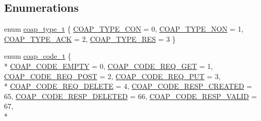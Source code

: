 \subsection*{Enumerations}
\begin{DoxyCompactItemize}
\item 
enum \hyperlink{group__open_coap_gafb608e0d646391b17d00513242200087}{coap\+\_\+type\+\_\+t} \{ \hyperlink{group__open_coap_ggafb608e0d646391b17d00513242200087a65c04ee4847d0c595238079ac9564e8d}{C\+O\+A\+P\+\_\+\+T\+Y\+P\+E\+\_\+\+C\+ON} = 0, 
\hyperlink{group__open_coap_ggafb608e0d646391b17d00513242200087a26b4b8fe681ea0720d68e1711741e073}{C\+O\+A\+P\+\_\+\+T\+Y\+P\+E\+\_\+\+N\+ON} = 1, 
\hyperlink{group__open_coap_ggafb608e0d646391b17d00513242200087a7b2fe2187018bce9132af2763b57307d}{C\+O\+A\+P\+\_\+\+T\+Y\+P\+E\+\_\+\+A\+CK} = 2, 
\hyperlink{group__open_coap_ggafb608e0d646391b17d00513242200087a924098f5424116957c8cf549c50ff066}{C\+O\+A\+P\+\_\+\+T\+Y\+P\+E\+\_\+\+R\+ES} = 3
 \}
\item 
enum \hyperlink{group__open_coap_gae99fde61d59e68af70c6bcd0c7b0256f}{coap\+\_\+code\+\_\+t} \{ \\*
\hyperlink{group__open_coap_ggae99fde61d59e68af70c6bcd0c7b0256fad23d0c658ea18ce7e1dd8f1f4be0e7ec}{C\+O\+A\+P\+\_\+\+C\+O\+D\+E\+\_\+\+E\+M\+P\+TY} = 0, 
\hyperlink{group__open_coap_ggae99fde61d59e68af70c6bcd0c7b0256faee813557f5b6ce3f2605ea60509447ee}{C\+O\+A\+P\+\_\+\+C\+O\+D\+E\+\_\+\+R\+E\+Q\+\_\+\+G\+ET} = 1, 
\hyperlink{group__open_coap_ggae99fde61d59e68af70c6bcd0c7b0256faf2caaa1bc9e105a08052339a30a8c8a3}{C\+O\+A\+P\+\_\+\+C\+O\+D\+E\+\_\+\+R\+E\+Q\+\_\+\+P\+O\+ST} = 2, 
\hyperlink{group__open_coap_ggae99fde61d59e68af70c6bcd0c7b0256fae340c702a79200fad8b4ae3dc207a4cb}{C\+O\+A\+P\+\_\+\+C\+O\+D\+E\+\_\+\+R\+E\+Q\+\_\+\+P\+UT} = 3, 
\\*
\hyperlink{group__open_coap_ggae99fde61d59e68af70c6bcd0c7b0256fab58ccb57cab7604f22c4b0a8f869dd37}{C\+O\+A\+P\+\_\+\+C\+O\+D\+E\+\_\+\+R\+E\+Q\+\_\+\+D\+E\+L\+E\+TE} = 4, 
\hyperlink{group__open_coap_ggae99fde61d59e68af70c6bcd0c7b0256fa4df5a42ae3703e135f2c51cb9bece412}{C\+O\+A\+P\+\_\+\+C\+O\+D\+E\+\_\+\+R\+E\+S\+P\+\_\+\+C\+R\+E\+A\+T\+ED} = 65, 
\hyperlink{group__open_coap_ggae99fde61d59e68af70c6bcd0c7b0256fa4c66de8dbed39024c4d24f079f419df0}{C\+O\+A\+P\+\_\+\+C\+O\+D\+E\+\_\+\+R\+E\+S\+P\+\_\+\+D\+E\+L\+E\+T\+ED} = 66, 
\hyperlink{group__open_coap_ggae99fde61d59e68af70c6bcd0c7b0256fa57f67a6e1de8273c6a59ae68e02fc844}{C\+O\+A\+P\+\_\+\+C\+O\+D\+E\+\_\+\+R\+E\+S\+P\+\_\+\+V\+A\+L\+ID} = 67, 
\\*

\end{DoxyCompactItemize}
